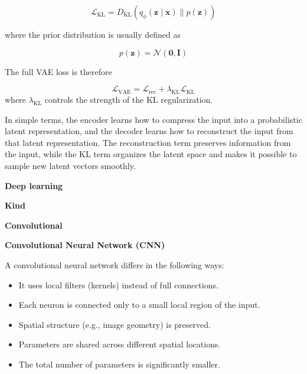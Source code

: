 \documentclass{book}
\providecommand{\ProjectDeepHeading}[2]{%
    \par\medskip\noindent\textbf{#2}\par\smallskip
}
\begin{document}
        \begin{equation}
            \mathcal{L}_{\mathrm{KL}}
            =
            D_{\mathrm{KL}}
            \left(
                q_{\ensuremath{\phi}}(\mathbf{z} \mid \mathbf{x})
                \parallel
                p(\mathbf{z})
            \right)
        \end{equation}
        
        where the prior distribution is usually defined as
        
        \begin{equation}
            p(\mathbf{z})
            =
            \mathcal{N}
            \left(
                \mathbf{0},
                \mathbf{I}
            \right)
        \end{equation}
        
        The full VAE loss is therefore
        
        \begin{equation}
            \mathcal{L}_{\mathrm{VAE}}
            =
            \mathcal{L}_{\mathrm{rec}}
            +
            \ensuremath{\lambda}_{\mathrm{KL}}
            \mathcal{L}_{\mathrm{KL}}
        \end{equation}
        where $\ensuremath{\lambda}_{\mathrm{KL}}$ controls the strength of the KL regularization.
        
        In simple terms, the encoder learns how to compress the input into a probabilistic latent representation, and the decoder learns how to reconstruct the input from that latent representation. The reconstruction term preserves information from the input, while the KL term organizes the latent space and makes it possible to sample new latent vectors smoothly.

\ProjectDeepHeading{1}{Deep learning}

\ProjectDeepHeading{2}{Kind}

\ProjectDeepHeading{3}{Convolutional}


\ProjectDeepHeading{6}{Convolutional Neural Network (CNN)}
        
        A convolutional neural network differs in the following ways:
        
        \begin{itemize}
            \item It uses local filters (kernels) instead of full connections.
            \item Each neuron is connected only to a small local region of the input.
            \item Spatial structure (e.g., image geometry) is preserved.
            \item Parameters are shared across different spatial locations.
            \item The total number of parameters is significantly smaller.
        \end{itemize}
        
\end{document}
